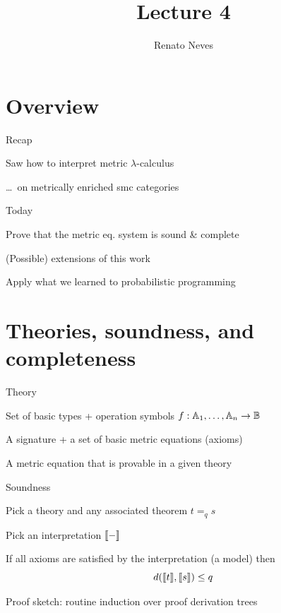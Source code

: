 \documentclass{beamer}
\author[Renato Neves]{Renato Neves}
\date{}
\begin{document}
\title{Lecture 4}

\frame[plain]{\titlepage}

\section{Overview}

\begin{frame}{Recap}

        Saw how to interpret \alert{metric} $\lambda$-calculus

        \dots\ on \alert{metrically enriched} smc categories
\end{frame}

\begin{frame}{Today}

        Prove that the metric eq. system is
        \alert{sound \& complete}

        \pause
        \bigskip
        (Possible) extensions of this work

        \pause
        \bigskip
        Apply what we learned to probabilistic programming
\end{frame}

\section{Theories, soundness, and completeness}

\begin{frame}{Theory}

        \begin{definition}[Signature]
                Set of basic types + operation symbols
                $f : \mathbb{A}_1, \dots, \mathbb{A}_n \to \mathbb{B}$
        \end{definition}


        \bigskip
        \pause
        \begin{definition}[Theory]
                A signature + a set of basic metric equations (axioms)
        \end{definition}


        \bigskip
        \pause
        \begin{definition}[Theorem]
                A metric equation that is provable in a given theory
        \end{definition}
\end{frame}

\begin{frame}{Soundness}

        Pick a theory and any associated theorem $t =_q s$
        
        Pick an interpretation $\llbracket - \rrbracket$ 

        If all axioms are satisfied by the interpretation (a model) then
        \[
                d(\llbracket t \rrbracket,\llbracket s \rrbracket) \leq q
        \]
                
        \pause
        \bigskip
        Proof sketch: routine induction over proof derivation trees
\end{frame}
\end{document}
